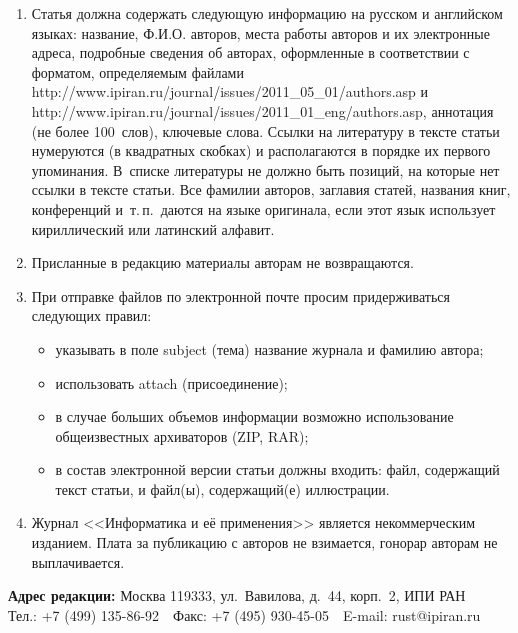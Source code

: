 {{\begin{enumerate}
слов, кроме стандартных, не применяются. Все страницы рукописи должны быть
пронумерованы. %
\item Статья должна содержать следующую информацию на русском и
английском языках: название, Ф.И.О. авторов, места работы авторов и их
электронные адреса, подробные сведения об авторах, оформленные в соответствии с форматом, 
определяемым файлами {\sf http://www.ipiran.ru/journal/issues/2011\_05\_01/authors.asp} и 
{\sf http://www.ipiran.ru/journal/issues/2011\_01\_eng/authors.asp},
аннотация (не более 100~слов), ключевые слова. Ссылки на
литературу в тексте статьи нумеруются (в квадратных скобках) и располагаются в
порядке их первого упоминания. В~списке литературы не должно быть позиций, на которые нет ссылки в тексте статьи.
Все фамилии авторов, заглавия статей, названия
книг, конференций и~т.\,п.\ даются на языке оригинала, если этот язык
использует кириллический или латинский алфавит. %
\item Присланные в редакцию материалы авторам не возвращаются.
\item При отправке файлов по электронной
почте просим придерживаться следующих правил:
\begin{itemize}
\item указывать в поле subject (тема) название журнала и фамилию автора; %
\item использовать attach (присоединение); %
\item в случае больших объемов информации возможно
использование общеизвестных архиваторов (ZIP, RAR); %
\item в состав электронной версии статьи должны входить: файл, содержащий текст статьи, и файл(ы),
содержащий(е) иллюстрации. %
\end{itemize}
\item Журнал <<Информатика и её применения>> является некоммерческим изданием. 
Плата за публикацию с авторов не взимается, гонорар авторам не выплачивается.
\end{enumerate}
\thispagestyle{empty}
\textbf{Адрес редакции:} Москва 119333,
ул.~Вавилова, д.~44, корп.~2, ИПИ РАН\\
Тел.: +7 (499) 135-86-92\ \
Факс:  +7 (495) 930-45-05\ \  E-mail:   rust@ipiran.ru }
}